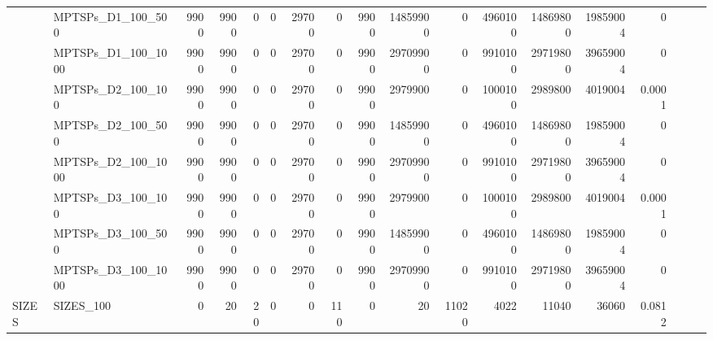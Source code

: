 \begin{table}[h]
{\begin{tabular}{llrrrrrrrrrrrrrlll}
			& MPTSPs\_D1\_100\_500         & 9900         & 9900        & 0          & 0            & 29700       & 0          & 9900    & 14859900 & 0      & 4960100 & 14869800 & 19859004   & 0         &                          &                          &                          \\
			& MPTSPs\_D1\_100\_1000        & 9900         & 9900        & 0          & 0            & 29700       & 0          & 9900    & 29709900 & 0      & 9910100 & 29719800 & 39659004   & 0         &                          &                          &                          \\
			& MPTSPs\_D2\_100\_100         & 9900         & 9900        & 0          & 0            & 29700       & 0          & 9900    & 2979900  & 0      & 1000100 & 2989800  & 4019004    & 0.0001    &                          &                          &                          \\
			& MPTSPs\_D2\_100\_500         & 9900         & 9900        & 0          & 0            & 29700       & 0          & 9900    & 14859900 & 0      & 4960100 & 14869800 & 19859004   & 0         &                          &                          &                          \\
			& MPTSPs\_D2\_100\_1000        & 9900         & 9900        & 0          & 0            & 29700       & 0          & 9900    & 29709900 & 0      & 9910100 & 29719800 & 39659004   & 0         &                          &                          &                          \\
			& MPTSPs\_D3\_100\_100         & 9900         & 9900        & 0          & 0            & 29700       & 0          & 9900    & 2979900  & 0      & 1000100 & 2989800  & 4019004    & 0.0001    &                          &                          &                          \\
			& MPTSPs\_D3\_100\_500         & 9900         & 9900        & 0          & 0            & 29700       & 0          & 9900    & 14859900 & 0      & 4960100 & 14869800 & 19859004   & 0         &                          &                          &                          \\
			& MPTSPs\_D3\_100\_1000        & 9900         & 9900        & 0          & 0            & 29700       & 0          & 9900    & 29709900 & 0      & 9910100 & 29719800 & 39659004   & 0         &                          &                          &                          \\ \hline
			\multirow{5}{*}{SIZES}      & SIZES\_100                   & 0            & 20          & 20         & 0            & 0           & 110        & 0       & 20       & 11020  & 4022    & 11040    & 36060      & 0.0812    &                          &                          &                          \\

\end{tabular}}
\end{table}

